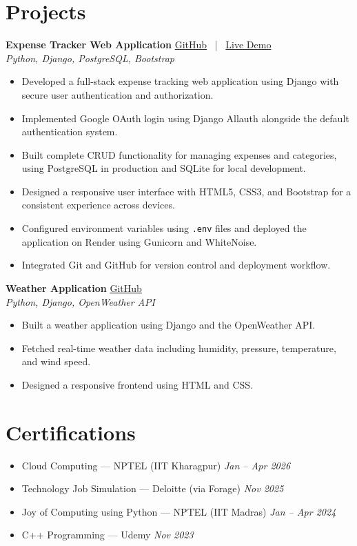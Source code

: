 \documentclass[10.5pt,a4paper]{article}
\newcommand{\resitem}[1]{\item #1}
\begin{document}
\section*{Projects}

\textbf{Expense Tracker Web Application} \hfill \href{https://github.com/PLACEHOLDER}{GitHub} \ | \ \href{https://PLACEHOLDER}{Live Demo} \\
\textit{Python, Django, PostgreSQL, Bootstrap}
\begin{itemize}
    \resitem{Developed a full-stack expense tracking web application using Django with secure user authentication and authorization.}
    \resitem{Implemented Google OAuth login using Django Allauth alongside the default authentication system.}
    \resitem{Built complete CRUD functionality for managing expenses and categories, using PostgreSQL in production and SQLite for local development.}
    \resitem{Designed a responsive user interface with HTML5, CSS3, and Bootstrap for a consistent experience across devices.}
    \resitem{Configured environment variables using \texttt{.env} files and deployed the application on Render using Gunicorn and WhiteNoise.}
    \resitem{Integrated Git and GitHub for version control and deployment workflow.}
\end{itemize}

\textbf{Weather Application} \hfill \href{https://github.com/PLACEHOLDER}{GitHub} \\
\textit{Python, Django, OpenWeather API}
\begin{itemize}
    \resitem{Built a weather application using Django and the OpenWeather API.}
    \resitem{Fetched real-time weather data including humidity, pressure, temperature, and wind speed.}
    \resitem{Designed a responsive frontend using HTML and CSS.}
\end{itemize}

\section*{Certifications}
\begin{itemize}
    \resitem{Cloud Computing --- NPTEL (IIT Kharagpur) \hfill \textit{Jan -- Apr 2026}}
    \resitem{Technology Job Simulation --- Deloitte (via Forage) \hfill \textit{Nov 2025}}
    \resitem{Joy of Computing using Python --- NPTEL (IIT Madras) \hfill \textit{Jan -- Apr 2024}}
    \resitem{C++ Programming --- Udemy \hfill \textit{Nov 2023}}
\end{itemize}
\end{document}
